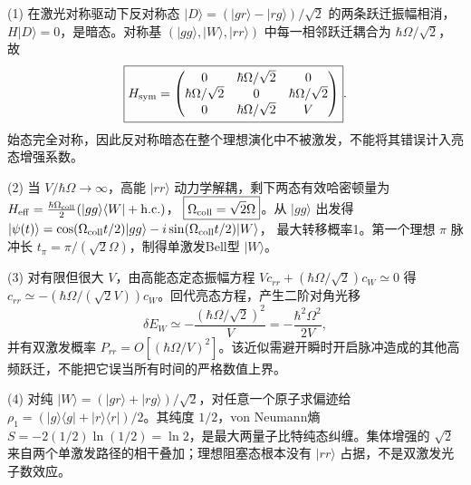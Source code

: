 (1) 在激光对称驱动下反对称态 \(|D\rangle=(|gr\rangle-|rg\rangle)/\sqrt2\) 的两条跃迁振幅相消，\(H|D\rangle=0\)，是暗态。对称基 \((|gg\rangle,|W\rangle,|rr\rangle)\) 中每一相邻跃迁耦合为 \(\hbar\Omega/\sqrt2\)，故
\[
\boxed{H_{\rm sym}=\begin{pmatrix}0&\hbar\Omega/\sqrt2&0\\
\hbar\Omega/\sqrt2&0&\hbar\Omega/\sqrt2\\0&\hbar\Omega/\sqrt2&V\end{pmatrix}}.
\]
始态完全对称，因此反对称暗态在整个理想演化中不被激发，不能将其错误计入亮态增强系数。

(2) 当 \(V/\hbar\Omega\to\infty\)，高能 \(|rr\rangle\) 动力学解耦，剩下两态有效哈密顿量为
\(H_{\rm eff}=\frac{\hbar\Omega_{\rm coll}}2(|gg\rangle\langle W|+\mathrm{h.c.})\)，
\(\boxed{\Omega_{\rm coll}=\sqrt2\Omega}\)。从 \(|gg\rangle\) 出发得
\(|\psi(t)\rangle=\cos(\Omega_{\rm coll}t/2)|gg\rangle-i\sin(\Omega_{\rm coll}t/2)|W\rangle\)，
最大转移概率1。第一个理想 \(\pi\) 脉冲长 \(\boxed{t_\pi=\pi/(\sqrt2\Omega)}\)，制得单激发Bell型 \(|W\rangle\)。

(3) 对有限但很大 \(V\)，由高能态定态振幅方程 \(V c_{rr}+(\hbar\Omega/\sqrt2)c_W\simeq0\) 得
\(c_{rr}\simeq-(\hbar\Omega/(\sqrt2V))c_W\)。回代亮态方程，产生二阶对角光移
\[
\boxed{\delta E_W\simeq-\frac{(\hbar\Omega/\sqrt2)^2}{V}
=-\frac{\hbar^2\Omega^2}{2V}},
\]
并有双激发概率 \(P_{rr}=O[(\hbar\Omega/V)^2]\)。该近似需避开瞬时开启脉冲造成的其他高频跃迁，不能把它误当所有时间的严格数值上界。

(4) 对纯 \(|W\rangle=(|gr\rangle+|rg\rangle)/\sqrt2\)，对任意一个原子求偏迹给 \(\rho_1=(|g\rangle\langle g|+|r\rangle\langle r|)/2\)。其纯度 \(1/2\)，von Neumann熵 \(S=-2(1/2)\ln(1/2)=\boxed{\ln2}\)，是最大两量子比特纯态纠缠。集体增强的 \(\sqrt2\) 来自两个单激发路径的相干叠加；理想阻塞态根本没有 \(|rr\rangle\) 占据，不是双激发光子数效应。
